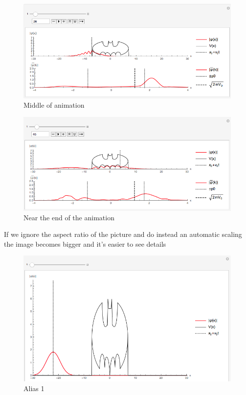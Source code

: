 \documentclass[titlepage]{article}
\begin{document}
\begin{figure}[ht]
\centering
\includegraphics[scale=0.5,center]{images/batman2.png}
\caption{Middle of animation}
\label{fig:2d}
\end{figure}
\FloatBarrier

\begin{figure}[ht]
\centering
\includegraphics[scale=0.5,center]{images/batman3.png}
\caption{Near the end of the animation}
\label{fig:2d}
\end{figure}
\FloatBarrier

If we ignore the aspect ratio of the picture and do instead an automatic scaling the image becomes bigger and it's easier to see details

\begin{figure}[ht]
\centering
\includegraphics[scale=0.5,center]{images/batmanbig1.png}
\caption{Alias 1}
\label{fig:2d}
\end{figure}
\FloatBarrier
\end{document}
